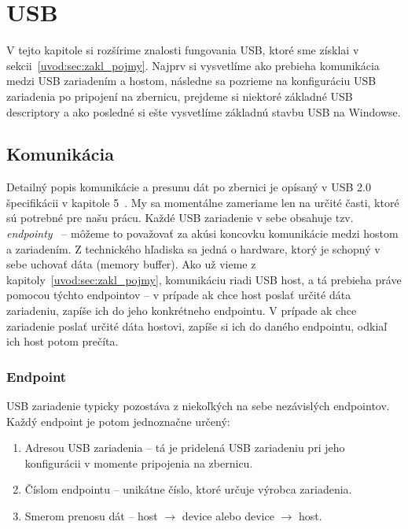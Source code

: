 \chapter{USB}
V tejto kapitole si rozšírime znalosti fungovania USB, ktoré sme získlai v sekcii~\ref{uvod:sec:zakl_pojmy}. Najprv si vysvetlíme ako prebieha komunikácia medzi USB zariadením a hostom, následne sa pozrieme na konfiguráciu USB zariadenia po pripojení na zbernicu, prejdeme si niektoré základné USB descriptory a ako posledné si ešte vysvetlíme základnú stavbu USB na Windowse.

\section{Komunikácia}
Detailný popis komunikácie a presunu dát po zbernici je opísaný v USB 2.0 špecifikácii v kapitole 5~\cite{usb_chap5}. My sa momentálne zameriame len na určité časti, ktoré sú potrebné pre našu prácu. Každé USB zariadenie v sebe obsahuje tzv. \textit{endpointy}~\cite{usb_chap5_endpoint} -- môžeme to považovať za akúsi koncovku komunikácie medzi hostom a zariadením. Z technického hľadiska sa jedná o hardware, ktorý je schopný v sebe uchovať dáta (memory buffer). Ako už vieme z kapitoly~\ref{uvod:sec:zakl_pojmy}, komunikáciu riadi USB host, a tá prebieha práve pomocou týchto endpointov -- v prípade ak chce host poslať určité dáta zariadeniu, zapíše ich do jeho konkrétneho endpointu. V prípade ak chce zariadenie poslať určité dáta hostovi, zapíše si ich do daného endpointu, odkiaľ ich host potom prečíta.

\subsection*{Endpoint}
USB zariadenie typicky pozostáva z niekoľkých na sebe nezávislých endpointov. Každý endpoint je potom jednoznačne určený:
\begin{enumerate}
\item Adresou USB zariadenia -- tá je pridelená USB zariadeniu pri jeho konfigurácii v momente pripojenia na zbernicu.
\item Číslom endpointu -- unikátne číslo, ktoré určuje výrobca zariadenia.
\item Smerom prenosu dát -- host $\longrightarrow$ device alebo device $\longrightarrow$ host.
\end{enumerate}

